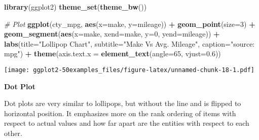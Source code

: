 \documentclass[a4paper]{article}
\newenvironment{Shaded}{\begin{snugshade}}{\end{snugshade}}
\newcommand{\KeywordTok}[1]{\textcolor[rgb]{0.13,0.29,0.53}{\textbf{#1}}}
\newcommand{\DataTypeTok}[1]{\textcolor[rgb]{0.13,0.29,0.53}{#1}}
\newcommand{\DecValTok}[1]{\textcolor[rgb]{0.00,0.00,0.81}{#1}}
\newcommand{\FloatTok}[1]{\textcolor[rgb]{0.00,0.00,0.81}{#1}}
\newcommand{\StringTok}[1]{\textcolor[rgb]{0.31,0.60,0.02}{#1}}
\newcommand{\CommentTok}[1]{\textcolor[rgb]{0.56,0.35,0.01}{\textit{#1}}}
\newcommand{\OperatorTok}[1]{\textcolor[rgb]{0.81,0.36,0.00}{\textbf{#1}}}
\newcommand{\NormalTok}[1]{#1}
\begin{document}
\begin{Shaded}
\begin{Highlighting}[]
\KeywordTok{library}\NormalTok{(ggplot2)}
\KeywordTok{theme_set}\NormalTok{(}\KeywordTok{theme_bw}\NormalTok{())}

\CommentTok{# Plot}
\KeywordTok{ggplot}\NormalTok{(cty_mpg, }\KeywordTok{aes}\NormalTok{(}\DataTypeTok{x=}\NormalTok{make, }\DataTypeTok{y=}\NormalTok{mileage)) }\OperatorTok{+}\StringTok{ }
\StringTok{  }\KeywordTok{geom_point}\NormalTok{(}\DataTypeTok{size=}\DecValTok{3}\NormalTok{) }\OperatorTok{+}\StringTok{ }
\StringTok{  }\KeywordTok{geom_segment}\NormalTok{(}\KeywordTok{aes}\NormalTok{(}\DataTypeTok{x=}\NormalTok{make, }
                   \DataTypeTok{xend=}\NormalTok{make, }
                   \DataTypeTok{y=}\DecValTok{0}\NormalTok{, }
                   \DataTypeTok{yend=}\NormalTok{mileage)) }\OperatorTok{+}\StringTok{ }
\StringTok{  }\KeywordTok{labs}\NormalTok{(}\DataTypeTok{title=}\StringTok{"Lollipop Chart"}\NormalTok{, }
       \DataTypeTok{subtitle=}\StringTok{"Make Vs Avg. Mileage"}\NormalTok{, }
       \DataTypeTok{caption=}\StringTok{"source: mpg"}\NormalTok{) }\OperatorTok{+}\StringTok{ }
\StringTok{  }\KeywordTok{theme}\NormalTok{(}\DataTypeTok{axis.text.x =} \KeywordTok{element_text}\NormalTok{(}\DataTypeTok{angle=}\DecValTok{65}\NormalTok{, }\DataTypeTok{vjust=}\FloatTok{0.6}\NormalTok{))}
\end{Highlighting}
\end{Shaded}

\texttt{[image: ggplot2-50examples\_files/figure-latex/unnamed-chunk-18-1.pdf]}

\newpage

\textbf{Dot Plot}

Dot plots are very similar to lollipops, but without the line and is
flipped to horizontal position. It emphasizes more on the rank ordering
of items with respect to actual values and how far apart are the
entities with respect to each other.
\end{document}
